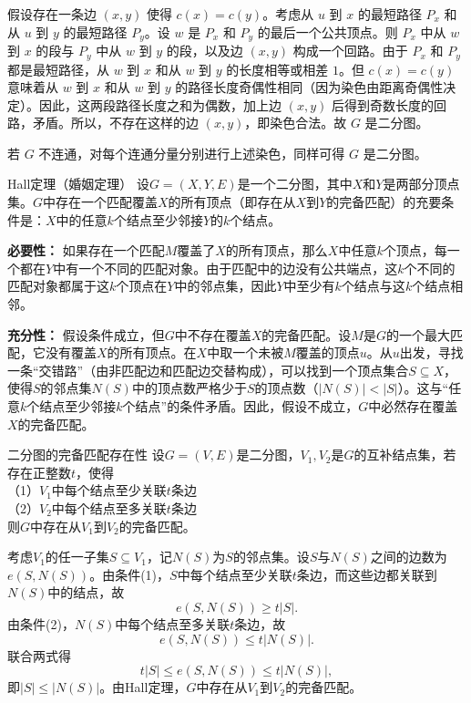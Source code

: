 \documentclass[lang=cn,11pt]{elegantbook}
\begin{document}
    假设存在一条边 $(x,y)$ 使得 $c(x)=c(y)$。考虑从 $u$ 到 $x$ 的最短路径 $P_x$ 和从 $u$ 到 $y$ 的最短路径 $P_y$。设 $w$ 是 $P_x$ 和 $P_y$ 的最后一个公共顶点。则 $P_x$ 中从 $w$ 到 $x$ 的段与 $P_y$ 中从 $w$ 到 $y$ 的段，以及边 $(x,y)$ 构成一个回路。由于 $P_x$ 和 $P_y$ 都是最短路径，从 $w$ 到 $x$ 和从 $w$ 到 $y$ 的长度相等或相差 $1$。但 $c(x)=c(y)$ 意味着从 $w$ 到 $x$ 和从 $w$ 到 $y$ 的路径长度奇偶性相同（因为染色由距离奇偶性决定）。因此，这两段路径长度之和为偶数，加上边 $(x,y)$ 后得到奇数长度的回路，矛盾。所以，不存在这样的边 $(x,y)$，即染色合法。故 $G$ 是二分图。

    若 $G$ 不连通，对每个连通分量分别进行上述染色，同样可得 $G$ 是二分图。

\begin{theorem}{Hall定理（婚姻定理）}
    设$G=(X,Y,E)$是一个二分图，其中$X$和$Y$是两部分顶点集。$G$中存在一个匹配覆盖$X$的所有顶点（即存在从$X$到$Y$的完备匹配）的充要条件是：$X$中的任意$k$个结点至少邻接$Y$的$k$个结点。
\end{theorem}
\textbf{必要性：} 如果存在一个匹配$M$覆盖了$X$的所有顶点，那么$X$中任意$k$个顶点，每一个都在$Y$中有一个不同的匹配对象。由于匹配中的边没有公共端点，这$k$个不同的匹配对象都属于这$k$个顶点在$Y$中的邻点集，因此$Y$中至少有$k$个结点与这$k$个结点相邻。

\textbf{充分性：} 假设条件成立，但$G$中不存在覆盖$X$的完备匹配。设$M$是$G$的一个最大匹配，它没有覆盖$X$的所有顶点。在$X$中取一个未被$M$覆盖的顶点$u$。从$u$出发，寻找一条“交错路”（由非匹配边和匹配边交替构成），可以找到一个顶点集合$S \subseteq X$，使得$S$的邻点集$N(S)$中的顶点数严格少于$S$的顶点数（$|N(S)| < |S|$）。这与“任意$k$个结点至少邻接$k$个结点”的条件矛盾。因此，假设不成立，$G$中必然存在覆盖$X$的完备匹配。
\begin{theorem}{二分图的完备匹配存在性}
    设$G=(V,E)$是二分图，$V_1,V_2$是$G$的互补结点集，若存在正整数$t$，使得\\
    （1）$V_1$中每个结点至少关联$t$条边\\
    （2）$V_2$中每个结点至多关联$t$条边\\
    则$G$中存在从$V_1$到$V_2$的完备匹配。
\end{theorem}
考虑$V_1$的任一子集$S\subseteq V_1$，记$N(S)$为$S$的邻点集。设$S$与$N(S)$之间的边数为$e(S,N(S))$。由条件(1)，$S$中每个结点至少关联$t$条边，而这些边都关联到$N(S)$中的结点，故
    \[
    e(S,N(S)) \ge t|S|.
    \]
    由条件(2)，$N(S)$中每个结点至多关联$t$条边，故
    \[
    e(S,N(S)) \le t|N(S)|.
    \]
    联合两式得
    \[
    t|S| \le e(S,N(S)) \le t|N(S)|,
    \]
    即$|S|\le |N(S)|$。由Hall定理，$G$中存在从$V_1$到$V_2$的完备匹配。
\end{document}

